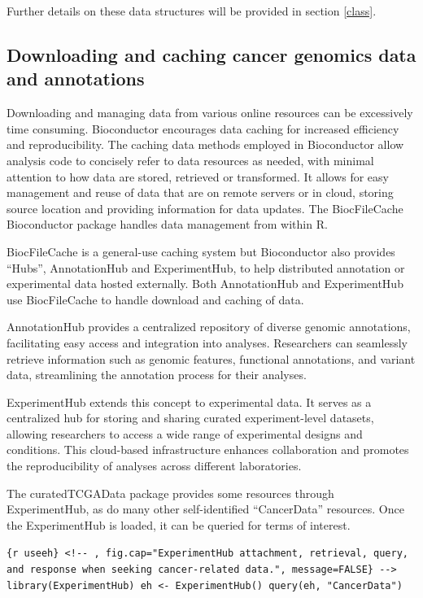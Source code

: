 \documentclass[]{article}
\begin{document}
Further details on these data structures will be provided in section \ref{class}.

\hypertarget{cache}{%
\subsection{Downloading and caching cancer genomics data and annotations}\label{cache}}

Downloading and managing data from various online resources
can be excessively time consuming. Bioconductor encourages data caching for
increased efficiency and reproducibility. The caching data methods
employed in Bioconductor
allow analysis code to
concisely refer to data resources as needed, with minimal attention to how
data are stored, retrieved or transformed.
It allows for easy management and reuse of data that are on remote
servers or in cloud, storing source
location and providing information for data updates. The BiocFileCache
Bioconductor package handles data management from within R.

BiocFileCache is a general-use caching system but Bioconductor also provides
``Hubs'', AnnotationHub and ExperimentHub, to help distributed annotation or
experimental data hosted externally. Both AnnotationHub and ExperimentHub use
BiocFileCache to handle download and caching of data.

AnnotationHub provides a centralized repository of diverse genomic annotations,
facilitating easy access and integration into analyses. Researchers can
seamlessly retrieve information such as genomic features, functional
annotations, and variant data, streamlining the annotation process for their
analyses.

ExperimentHub extends this concept to experimental data. It serves as a
centralized hub for storing and sharing curated experiment-level datasets,
allowing researchers to access a wide range of experimental designs and
conditions. This cloud-based infrastructure enhances collaboration and promotes
the reproducibility of analyses across different laboratories.

The curatedTCGAData package provides some resources through
ExperimentHub, as do many other self-identified ``CancerData'' resources. Once the
ExperimentHub is loaded, it can be queried for terms of interest.

\texttt{\{r useeh\} \textless{}!-\/- , fig.cap="ExperimentHub attachment, retrieval, query, and response when seeking cancer-related data.", message=FALSE\} -\/-\textgreater{} library(ExperimentHub) eh \textless{}- ExperimentHub() query(eh, "CancerData")}
\end{document}
